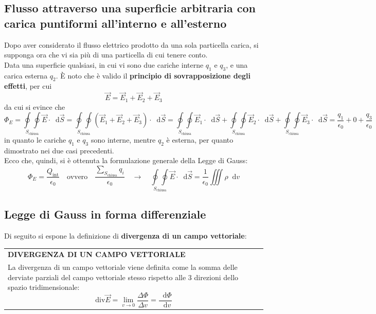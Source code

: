 \documentclass[a4paper]{extarticle}
\renewcommand\arraystretch{}
\newcommand\dif{\mathop{}\!\mathrm{d}}
\begin{document}
\subsection{Flusso attraverso una superficie arbitraria con carica puntiformi all'interno e all'esterno}
Dopo aver considerato il flusso elettrico prodotto da una sola particella carica, si supponga ora che vi sia più di una particella di cui tenere conto.\\
Data una superficie qualsiasi, in cui vi sono due cariche interne $q_1$ e $q_3$, e una carica esterna $q_2$. È noto che è valido il \textbf{principio di sovrapposizione degli effetti}, per cui
\[\vec E = \vec{E}_1 + \vec{E}_2 + \vec{E}_3\]
da cui si evince che
\[\Phi_E = \underset{S_\text{chiusa}}{\oint \oint} \vec E \cdot \dif \vec S = \underset{S_\text{chiusa}}{\oint \oint} (\vec{E}_1 + \vec{E}_2 + \vec{E}_3) \cdot \dif \vec S = \underset{S_\text{chiusa}}{\oint \oint} \vec{E}_1 \cdot \dif \vec S + \underset{S_\text{chiusa}}{\oint \oint} \vec{E}_2 \cdot \dif \vec S + \underset{S_\text{chiusa}}{\oint \oint} \vec{E}_3 \cdot \dif \vec S = \frac{q_1}{\epsilon_0} + 0 + \frac{q_3}{\epsilon_0}\]
in quanto le cariche $q_1$ e $q_3$ sono interne, mentre $q_2$ è esterna, per quanto dimostrato nei due casi precedenti.\\
Ecco che, quindi, si è ottenuta la formulazione generale della Legge di Gauss:
\[\Phi_E = \frac{Q_\text{int}}{\epsilon_0} \hspace{1em} \text{ovvero} \hspace{1em} \dfrac{\sum_{S_\text{chiusa}} q_i}{\epsilon_0} \hspace{1em} \rightarrow \hspace{1em} \underset{S_\text{chiusa}}{\oint \oint} \vec E \cdot \dif \vec S = \frac{1}{\epsilon_0} \iiint \rho \dif v\]

\vspace{1em}
\noindent
\subsection{Legge di Gauss in forma differenziale}
Di seguito si espone la definizione di \textbf{divergenza di un campo vettoriale}:

\vspace{1em}
\setlength{\tabcolsep}{14pt}
\renewcommand{\arraystretch}{2}
\noindent
\begin{tabularx}{\textwidth}{@{}|P|@{}}
    \hline
    {\textbf{DIVERGENZA DI UN CAMPO VETTORIALE}}\\
    \parbox{\linewidth}{La divergenza di un campo vettoriale viene definita come la somma delle derviate parziali del campo vettoriale stesso rispetto alle $3$ direzioni dello spazio tridimensionale:
    \[\boxed{\text{div} \vec E = \lim_{v \to 0} \frac{\Delta \Phi}{\Delta v} = \frac{\dif \Phi}{\dif v}}\]
    \vspace{1mm}}\\
    \hline
\end{tabularx}
\end{document}
